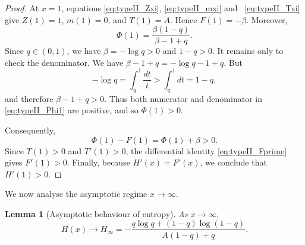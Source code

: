 \documentclass[10pt,a4paper]{amsart}
\newtheorem{lem}[thm]{Lemma}
\theoremstyle{definition}
\theoremstyle{remark}
\numberwithin{equation}{section}
\begin{document}
%
%
\begin{proof}

At \(x=1\), equations \eqref{eq:typeII_Zxi},
\eqref{eq:typeII_mxi}
and \
\eqref{eq:typeII_Txi} give
	\(Z(1)=1\), \(m(1)=0\), and \(T(1)=A\). Hence
	\(F(1)=-\beta\). Moreover,
	\begin{equation}
		\Phi(1)
		=
		\frac{\beta(1-q)}{\beta-1+q}.
		\label{eq:typeII_Phi1}
	\end{equation}
	Since \(q\in(0,1)\), we have \(\beta=-\log q>0\) and
	\(1-q>0\). It remains only to check the denominator. We have
	$
	\beta-1+q
	=
	-\log q-1+q.
	$
	But
	\[
	-\log q
	=
	\int_q^1 \frac{dt}{t}
	>
	\int_q^1 dt
	=
	1-q,
	\]
	and therefore \(\beta-1+q>0\). Thus both numerator and
	denominator in \eqref{eq:typeII_Phi1} are positive, and so
	\(\Phi(1)>0\).
	
	Consequently,
	\[
	\Phi(1)-F(1)=\Phi(1)+\beta>0.
	\]
	Since \(T(1)>0\) and \(T'(1)>0\), the differential identity
	\eqref{eq:typeII_Fprime} gives \(F'(1)>0\). Finally, because
	\(H'(x)=F'(x)\), we conclude that \(H'(1)>0\).
\end{proof}

We now analyse the asymptotic regime $x \to \infty$.

\begin{lem}[Asymptotic behaviour of entropy]
\label{lem:typeII_Hinfty}
As
\(
x\to\infty,
\)
\begin{equation*}
H(x)
\longrightarrow
H_\infty
=
-
\frac{
q\log q+(1-q)\log(1-q)
}{
A(1-q)+q
}.
\label{eq:typeII_Hinfty}
\end{equation*}
\end{lem}
\end{document}
